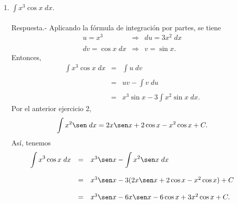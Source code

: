\begin{enumerate}[\bfseries 1.]
	\item $\displaystyle\int x^3\cos x\; dx$.\\\\
	    Respuesta.-\; Aplicando la fórmula de integración por partes, se tiene
	    $$\begin{array}{rcl}
		u=x^3 &\Rightarrow& du=3x^2\; dx\\\\
		dv=\cos x\; dx &\Rightarrow& v=\sin x.
	    \end{array}$$
	    Entonces,
	    $$\begin{array}{rcl}
		\displaystyle\int x^3\cos x\; dx &=& \displaystyle\int u\; dv\\\\
					       &=& uv - \displaystyle\int v\; du\\\\
					       &=& x^3\sin x - 3\displaystyle\int x^2\sin x\; dx.
	    \end{array}$$
	    Por el anterior ejercicio 2,
	    $$\int x^2\sen \; dx = 2x\sen x + 2\cos x -x^2\cos x +C.$$
	    Así, tenemos
	    $$\begin{array}{rcl}
		\displaystyle\int x^3\cos x\; dx &=& x^3\sen x - \displaystyle\int x^2\sen x\; dx\\\\
						 &=&x^3\sen x - 3(2x\sen x + 2\cos x -x^2\cos x)+C\\\\
						 &=& x^3\sen x - 6x\sen x - 6\cos x + 3x^2\cos x + C.
	    \end{array}$$
	    \vspace{0.5cm}


\end{enumerate}
